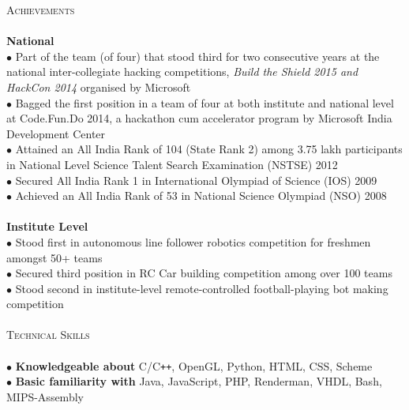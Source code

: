 \documentclass[a4paper,9pt]{article}
\begin{document}
\textcolor{myrust}{\large{\textsc{Achievements}}}\textcolor{mygray}{\sout{\hfill}}\\\\
\small %
\textbf{National}\\
$\bullet$ Part of the team (of four) that stood third for two consecutive years at the national inter-collegiate hacking competitions, \textsl{Build the Shield 2015 and HackCon 2014} organised by Microsoft\\ 
$\bullet$ Bagged the first position in a team of four at both institute and national level at Code.Fun.Do 2014, a hackathon cum accelerator program by Microsoft India Development Center\\ 
$\bullet$ Attained an All India Rank of 104 (State Rank 2) among 3.75 lakh participants in National Level Science Talent Search Examination (NSTSE) 2012\\ 
$\bullet$ Secured All India Rank 1 in International Olympiad of Science (IOS) 2009\\ 
$\bullet$ Achieved an All India Rank of 53 in National Science Olympiad (NSO) 2008\\\\
\textbf{Institute Level}\\
$\bullet$ Stood first in autonomous line follower robotics competition for freshmen amongst 50+ teams\\ 
$\bullet$ Secured third position in RC Car building competition among over 100 teams\\ 
$\bullet$ Stood second in institute-level remote-controlled football-playing bot making competition\\\\

\textcolor{myrust}{\large{\textsc{Technical Skills}}}\textcolor{mygray}{\sout{\hfill}}\\\\
\small %
$\bullet$ \textbf{Knowledgeable about} C/C\verb!++!, OpenGL, Python, HTML, CSS, Scheme\\
$\bullet$ \textbf{Basic familiarity with} Java, JavaScript, PHP, Renderman, VHDL, Bash, MIPS-Assembly\\\\
\end{document}
